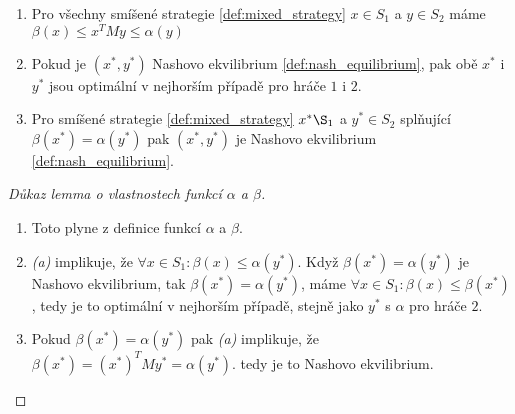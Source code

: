 \begin{theorem}
\label{thm:lemma_alpha_beta}
\begin{enumerate}
    \item Pro všechny smíšené strategie \ref{def:mixed_strategy} $x \in S_1$ a $y \in S_2$ máme $\beta(x) \leq x^T M y\leq \alpha(y)$ 
    \item Pokud je $(x^*, y^*)$ Nashovo ekvilibrium \ref{def:nash_equilibrium}, pak obě $x^*$ i $y^*$ jsou optimální v nejhorším případě pro hráče $1$ i $2$. 
    \item Pro smíšené strategie \ref{def:mixed_strategy} $x^* \S_1$ a $y^* \in S_2$ splňující $\beta(x^*) = \alpha(y^*)$ pak $(x^*, y^*)$ je Nashovo ekvilibrium \ref{def:nash_equilibrium}.
\end{enumerate}
\end{theorem}
\begin{proof}[Důkaz lemma o vlastnostech funkcí $\alpha$ a $\beta$]
\begin{enumerate}
    \item Toto plyne z definice funkcí $\alpha$ a $\beta$. 
    \item \textit{(a)} implikuje, že $\forall x \in S_1: \beta(x) \leq \alpha(y^*)$. Když $\beta(x^*) = \alpha(y^*)$ je Nashovo ekvilibrium, tak $\beta(x^*) = \alpha(y^*)$, máme $\forall x \in S_1: \beta(x) \leq \beta(x^*)$, tedy je to optimální v nejhorším případě, stejně jako $y^*$ s $\alpha$ pro hráče $2$.
    \item Pokud $\beta(x^*) = \alpha(y^*)$ pak \textit{(a)} implikuje, že $\beta(x^*) = (x^*)^T M y^* = \alpha(y^*)$. tedy je to Nashovo ekvilibrium. 
\end{enumerate}
\end{proof}
